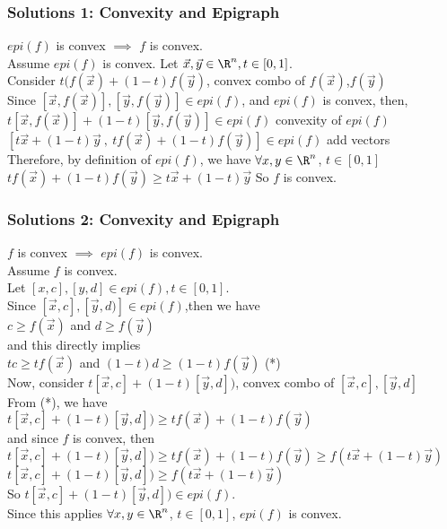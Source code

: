 \documentclass{beamer}
\newcommand{\x}{\vec{x} }
\newcommand{\y}{\vec{y} }
\begin{document}
\begin{frame}
\frametitle{Solutions 1: Convexity and Epigraph}
\begin{solution}
$epi(f)$ is convex $\implies$ $f$ is convex.\\
\medskip 
Assume $epi(f)$ is convex. Let $\x,\y \in \R^n, t\in[0,1]$.\\
Consider $t(f(\x)+(1-t)f(\y)$, \quad convex combo of $f(\vec{x})$,$f(\y)$\\
Since $[\x,f(\x)],[\y,f(\y)]\in epi(f)$, and $epi(f)$ is convex, then,\\
\medskip
\quad $t[\x,f(\x)]+(1-t)[\y,f(\y)] \in epi(f)$ \qquad \quad convexity of $epi(f)$\\
\quad $[t \x +(1-t)\y\ ,\ t f(\x )+(1-t)f(\y )] \in epi(f)$ \qquad add vectors \\
\medskip 
Therefore, by definition of $epi(f)$, we have $\forall x,y\in \R^n$, $t \in [0,1]$ \\
\quad $t f(\x )+(1-t)f(\y ) \geq t \x +(1-t)\y$
So $f$ is convex.

\end{solution}
\end{frame}


\begin{frame}
\frametitle{Solutions 2:  Convexity and Epigraph}
\begin{solution}
$f$ is convex $\implies$ $epi(f)$ is convex.\\
Assume $f$ is convex.\\
 Let $[x,c],[y,d] \in epi(f), t\in[0,1]$. \\
Since $[\x,c],[\y,d)]\in epi(f)$,then we have \\
\quad $c \geq f(\x)$ and $d \geq f(\y)$ \\
and this directly implies\\
\quad $tc \geq tf(\x)$ and $(1-t)d \geq (1-t) f(\y)$ \quad \qquad (*)\\
Now, consider $t[\x,c]+(1-t)[\y,d])$, \quad convex combo of $[\x,c],[\y,d]$ \\
From (*), we have \\
\quad $t[\x,c]+(1-t)[\y,d]) \geq tf(\x) + (1-t) f(\y)$ \\
and since $f$ is convex, then\\
\quad $t[\x,c]+(1-t)[\y,d]) \geq tf(\x) + (1-t) f(\y) \geq f(t\x + (1-t)\y )$\\
\quad $t[\x,c]+(1-t)[\y,d]) \geq f(t\x + (1-t)\y )$ \\
So $t[\x,c]+(1-t)[\y,d])\in epi(f)$.\\
Since this applies $\forall x,y\in \R^n$, $t \in [0,1]$, $epi(f)$ is convex.
\end{solution}
\end{frame}
\end{document}
